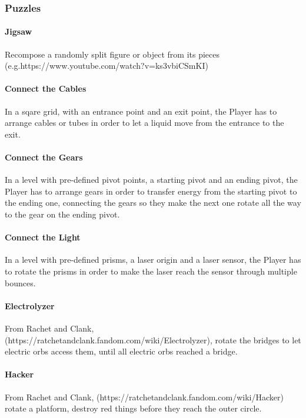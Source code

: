 \subsubsection{Puzzles}

\paragraph{Jigsaw} Recompose a randomly split figure or object from its pieces \\(e.g.https://www.youtube.com/watch?v=ks3vbiCSmKI)

\paragraph{Connect the Cables} In a sqare grid, with an entrance point and an exit point, the Player has to arrange cables or tubes in order to let a liquid move from the entrance to the exit.

\paragraph{Connect the Gears} In a level with pre-defined pivot points, a starting pivot and an ending pivot, the Player has to arrange gears in order to transfer energy from the starting pivot to the ending one, connecting the gears so they make the next one rotate all the way to the gear on the ending pivot.

\paragraph{Connect the Light} In a level with pre-defined prisms, a laser origin and a laser sensor, the Player has to rotate the prisms in order to make the laser reach the sensor through multiple bounces.

\paragraph{Electrolyzer} From Rachet and Clank, (https://ratchetandclank.fandom.com/wiki/Electrolyzer), rotate the bridges to let electric orbs access them, until all electric orbs reached a bridge.


\paragraph{Hacker} From Rachet and Clank, (https://ratchetandclank.fandom.com/wiki/Hacker) rotate a platform, destroy red things before they reach the outer circle.

